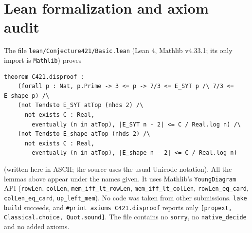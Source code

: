 \documentclass[11pt]{article}
\theoremstyle{definition}
\begin{document}
\section{Lean formalization and axiom audit}

The file \texttt{lean/Conjecture421/Basic.lean} (Lean 4, Mathlib v4.33.1; its only import is
\texttt{Mathlib}) proves
\begin{verbatim}
theorem C421.disproof :
    (forall p : Nat, p.Prime -> 3 <= p -> 7/3 <= E_SYT p /\ 7/3 <= E_shape p) /\
    (not Tendsto E_SYT atTop (nhds 2) /\
      not exists C : Real,
        eventually (n in atTop), |E_SYT n - 2| <= C / Real.log n) /\
    (not Tendsto E_shape atTop (nhds 2) /\
      not exists C : Real,
        eventually (n in atTop), |E_shape n - 2| <= C / Real.log n)
\end{verbatim}
(written here in ASCII; the source uses the usual Unicode notation). All the lemmas above appear
under the names given. It uses Mathlib's \texttt{YoungDiagram} API (\texttt{rowLen}, \texttt{colLen},
\texttt{mem\_iff\_lt\_rowLen}, \texttt{mem\_iff\_lt\_colLen}, \texttt{rowLen\_eq\_card},
\texttt{colLen\_eq\_card}, \texttt{up\_left\_mem}). No code was taken from other submissions.
\texttt{lake build} succeeds, and \texttt{\#print axioms C421.disproof} reports only
\texttt{[propext, Classical.choice, Quot.sound]}. The file contains no \texttt{sorry}, no
\texttt{native\_decide} and no added axioms.
\end{document}
